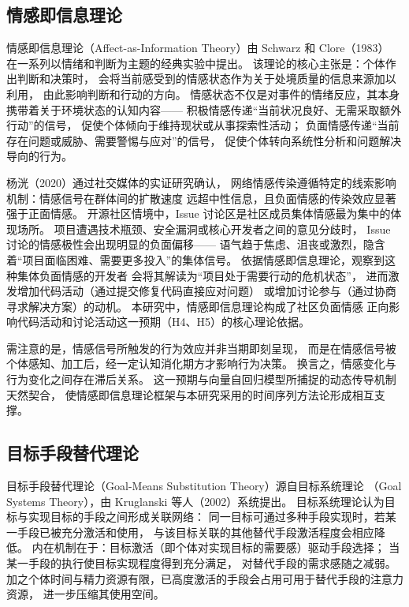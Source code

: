 \documentclass[
    type = master, %
    degree = professional,        %
    decl-page,  %
    twoside,                %
    fontset = fandol %
  ]{njuthesis}
\begin{document}
\subsection{情感即信息理论}

情感即信息理论（Affect-as-Information Theory）由 Schwarz 和 Clore（1983）
在一系列以情绪和判断为主题的经典实验中提出\cite{schwarz1983moods}。
该理论的核心主张是：个体作出判断和决策时，
会将当前感受到的情感状态作为关于处境质量的信息来源加以利用，
由此影响判断和行动的方向。
情感状态不仅是对事件的情绪反应，其本身携带着关于环境状态的认知内容——
积极情感传递“当前状况良好、无需采取额外行动”的信号，
促使个体倾向于维持现状或从事探索性活动；
负面情感传递“当前存在问题或威胁、需要警惕与应对”的信号，
促使个体转向系统性分析和问题解决导向的行为。

杨{\notoserifjk 洸}（2020）通过社交媒体的实证研究确认，
网络情感传染遵循特定的线索影响机制：情感信号在群体间的扩散速度
远超中性信息，且负面情感的传染效应显著强于正面情感\cite{yang2020sentiment}。
开源社区情境中，Issue 讨论区是社区成员集体情感最为集中的体现场所。
项目遭遇技术瓶颈、安全漏洞或核心开发者之间的意见分歧时，
Issue 讨论的情感极性会出现明显的负面偏移——
语气趋于焦虑、沮丧或激烈，隐含着“项目面临困难、需要更多投入”的集体信号。
依据情感即信息理论，观察到这种集体负面情感的开发者
会将其解读为“项目处于需要行动的危机状态”，
进而激发增加代码活动（通过提交修复代码直接应对问题）
或增加讨论参与（通过协商寻求解决方案）的动机。
本研究中，情感即信息理论构成了社区负面情感
正向影响代码活动和讨论活动这一预期（H4、H5）的核心理论依据。

需注意的是，情感信号所触发的行为效应并非当期即刻呈现，
而是在情感信号被个体感知、加工后，经一定认知消化期方才影响行为决策。
换言之，情感变化与行为变化之间存在滞后关系。
这一预期与向量自回归模型所捕捉的动态传导机制天然契合，
使情感即信息理论框架与本研究采用的时间序列方法论形成相互支撑。

\subsection{目标手段替代理论}

目标手段替代理论（Goal-Means Substitution Theory）源自目标系统理论
（Goal Systems Theory），由 Kruglanski 等人（2002）系统提出\cite{kruglanski2002theory}。
目标系统理论认为目标与实现目标的手段之间形成关联网络：
同一目标可通过多种手段实现时，若某一手段已被充分激活和使用，
与该目标关联的其他替代手段激活程度会相应降低。
内在机制在于：目标激活（即个体对实现目标的需要感）驱动手段选择；
当某一手段的执行使目标实现程度得到充分满足，
对替代手段的需求感随之减弱。
加之个体时间与精力资源有限，已高度激活的手段会占用可用于替代手段的注意力资源，
进一步压缩其使用空间。
\end{document}
